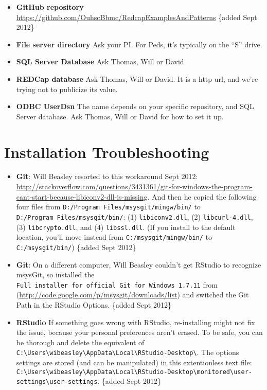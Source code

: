\documentclass[]{book}
\begin{document}
\begin{itemize}
\item
  \textbf{GitHub repository} \url{https://github.com/OuhscBbmc/RedcapExamplesAndPatterns} \{added Sept 2012\}
\item
  \textbf{File server directory} Ask your PI. For Peds, it's typically on the ``S'' drive.
\item
  \textbf{SQL Server Database} Ask Thomas, Will or David
\item
  \textbf{REDCap database} Ask Thomas, Will or David. It is a http url, and we're trying not to publicize its value.
\item
  \textbf{ODBC UserDsn} The name depends on your specific repository, and SQL Server database. Ask Thomas, Will or David for how to set it up.
\end{itemize}

\hypertarget{installation-troubleshooting}{%
\section{Installation Troubleshooting}\label{installation-troubleshooting}}

\begin{itemize}
\item
  \textbf{Git}: Will Beasley resorted to this workaround Sept 2012: \url{http://stackoverflow.com/questions/3431361/git-for-windows-the-program-cant-start-because-libiconv2-dll-is-missing}. And then he copied the following four files from \texttt{D:/Program\ Files/msysgit/mingw/bin/} to \texttt{D:/Program\ Files/msysgit/bin/}: (1) \texttt{libiconv2.dll}, (2) \texttt{libcurl-4.dll}, (3) \texttt{libcrypto.dll}, and (4) \texttt{libssl.dll}. (If you install to the default location, you'll move instead from \texttt{C:/msysgit/mingw/bin/} to \texttt{C:/msysgit/bin/}) \{added Sept 2012\}
\item
  \textbf{Git}: On a different computer, Will Beasley couldn't get RStudio to recognize msysGit, so installed the \texttt{Full\ installer\ for\ official\ Git\ for\ Windows\ 1.7.11} from (\url{http://code.google.com/p/msysgit/downloads/list}) and switched the Git Path in the RStudio Options. \{added Sept 2012\}
\item
  \textbf{RStudio} If something goes wrong with RStudio, re-installing might not fix the issue, because your personal preferences aren't erased. To be safe, you can be thorough and delete the equivalent of \texttt{C:\textbackslash{}Users\textbackslash{}wibeasley\textbackslash{}AppData\textbackslash{}Local\textbackslash{}RStudio-Desktop\textbackslash{}}. The options settings are stored (and can be manipulated) in this extentionless text file: \texttt{C:\textbackslash{}Users\textbackslash{}wibeasley\textbackslash{}AppData\textbackslash{}Local\textbackslash{}RStudio-Desktop\textbackslash{}monitored\textbackslash{}user-settings\textbackslash{}user-settings}. \{added Sept 2012\}
\end{itemize}
\end{document}
